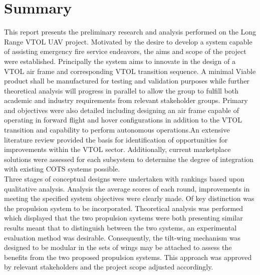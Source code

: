 \clearpage











\clearpage
\section{Summary}
This report presents the preliminary research and analysis performed on the Long Range VTOL UAV project. Motivated by the desire to develop a system capable of assisting emergency fire service endeavors, the aims and scope of the project were established. Principally the system aims to innovate in the design of a VTOL air frame and corresponding VTOL transition sequence. A minimal Viable product shall be manufactured for testing and validation purposes while further theoretical analysis will progress in parallel to allow the group to fulfill both academic and industry requirements from relevant stakeholder groups. Primary and objectives were also detailed including designing an air frame capable of operating in forward flight and hover configurations in addition to the VTOL transition and capability to perform autonomous operations.An extensive literature review provided the basis for identification of opportunities for improvements within the VTOL sector. Additionally, current marketplace solutions were assessed for each subsystem to determine the degree of integration with existing COTS systems possible.  \\

Three stages of conceptual designs were undertaken with rankings based upon qualitative analysis. Analysis the average scores of each round, improvements in meeting the specified system objectives were clearly made. Of key distinction was the propulsion system to be incorporated. Theoretical analysis was performed which displayed that the two propulsion systems were both presenting similar results meant that to distinguish between the two systems, an experimental evaluation method was desirable. Consequently, the tilt-wing mechanism was designed to be modular in the sets of wings may be attached to assess the benefits from the two proposed propulsion systems. This approach was approved by relevant stakeholders and the project scope adjusted accordingly. 

